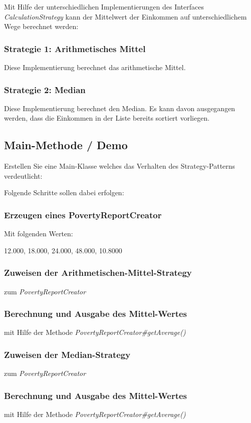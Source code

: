 \documentclass[oneside,a4paper]{scrartcl}
\begin{document}
Mit Hilfe der unterschiedlichen Implementierungen des Interfaces \emph{CalculationStrategy}
kann der Mittelwert der Einkommen auf unterschiedlichem Wege berechnet werden:


\subsubsection{Strategie 1: Arithmetisches Mittel}
Diese Implementierung berechnet das arithmetische Mittel.

\subsubsection{Strategie 2: Median}
Diese Implementierung berechnet den Median.
Es kann davon ausgegangen werden, dass die Einkommen in der Liste bereits sortiert vorliegen.

\subsection{Main-Methode / Demo}
Erstellen Sie eine Main-Klasse welches das Verhalten des Strategy-Patterns verdeutlicht:

\noindent Folgende Schritte sollen dabei erfolgen:


\subsubsection{Erzeugen eines PovertyReportCreator}

Mit folgenden Werten:

12.000,
18.000,
24.000,
48.000,
10.8000

\subsubsection{Zuweisen der Arithmetischen-Mittel-Strategy}
zum \emph{PovertyReportCreator}

\subsubsection{Berechnung und Ausgabe des Mittel-Wertes}
mit Hilfe der Methode \emph{PovertyReportCreator\#getAverage()}

\subsubsection{Zuweisen der Median-Strategy}
zum \emph{PovertyReportCreator}

\subsubsection{Berechnung und Ausgabe des Mittel-Wertes}
mit Hilfe der Methode \emph{PovertyReportCreator\#getAverage()}
\end{document}
